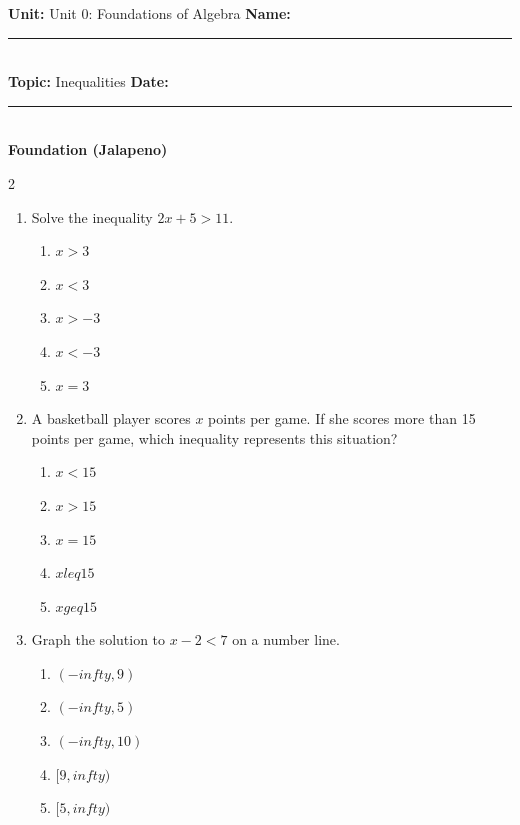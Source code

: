 \documentclass[10pt]{article}
\begin{document}
\enlargethispage{2.5cm}

\begin{tcolorbox}[colback=mainblue!5, colframe=mainblue, sharp corners, boxrule=0.5pt]
    \small \textbf{Unit:} Unit 0: Foundations of Algebra \hfill \textbf{Name:} \rule{3cm}{0.4pt} \\
    \small \textbf{Topic:} Inequalities \hfill \textbf{Date:} \rule{2cm}{0.4pt} \\
    \centering \textbf{\large Foundation (Jalapeno)}
\end{tcolorbox}

\vspace{0.2cm}

\begin{multicols}{2}
\begin{enumerate}[label=\textbf{Q\arabic*.}, leftmargin=*, itemsep=6pt, parsep=0pt]

  \item \small Solve the inequality $2x + 5 > 11$.
  \begin{enumerate}[label=(\Alph*), leftmargin=0.6cm, nosep, itemsep=2pt]
    \item $x > 3$
    \item $x < 3$
    \item $x > -3$
    \item $x < -3$
    \item $x = 3$
  \end{enumerate}

  \item \small A basketball player scores $x$ points per game. If she scores more than 15 points per game, which inequality represents this situation?
  \begin{enumerate}[label=(\Alph*), leftmargin=0.6cm, nosep, itemsep=2pt]
    \item $x < 15$
    \item $x > 15$
    \item $x = 15$
    \item $x leq 15$
    \item $x geq 15$
  \end{enumerate}

  \item \small Graph the solution to $x - 2 < 7$ on a number line.
  \begin{enumerate}[label=(\Alph*), leftmargin=0.6cm, nosep, itemsep=2pt]
    \item $(-infty, 9)$
    \item $(-infty, 5)$
    \item $(-infty, 10)$
    \item $[9, infty)$
    \item $[5, infty)$
  \end{enumerate}


\end{enumerate}
\end{multicols}
\end{document}
